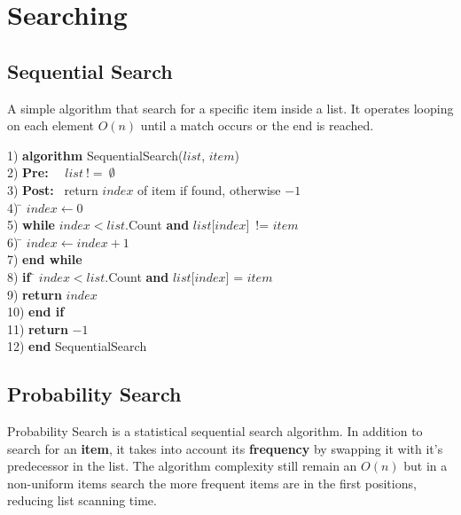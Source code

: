 \chapter{Searching}

\section{Sequential Search}
A simple algorithm that search for a specific item inside a list. It operates looping on each element $O(n)$ until a match occurs or the end is reached.

\begin{tabbing}
1) \textbf{alg}\= \textbf{orithm} SequentialSearch($list$, $item$)\\
2) \> \textbf{Pre:}~~ $list~!=~\emptyset$ \\
3) \> \textbf{Post:}~ return $index$ of item if found, otherwise $-1$ \\
4) \> \= $index \leftarrow 0$ \\
5) \> \textbf{whi}\= \textbf{le} $index < list$.Count  \textbf{and} $list$[$index$]~!= $item$ \\
6) \> \> \= $index \leftarrow index+1$ \\
7) \> \textbf{end while} \\
8) \> \textbf{if }\= $ index < list$.Count  \textbf{and} $list$[$index$] = $item$ \\
9) \> \> \textbf{return} $index$ \\
10)\> \textbf{end if} \\
11)\> \textbf{return} $-1$ \\ 
12) \textbf{end} SequentialSearch \\

\end{tabbing}

\section{Probability Search}
Probability Search is a statistical sequential search algorithm. In addition to search for an \textbf{item}, it takes into account its \textbf{frequency} by swapping it with it's predecessor in the list. The algorithm complexity still remain an $O(n)$ but in a non-uniform items search the more frequent items are in the first positions, reducing list scanning time.

